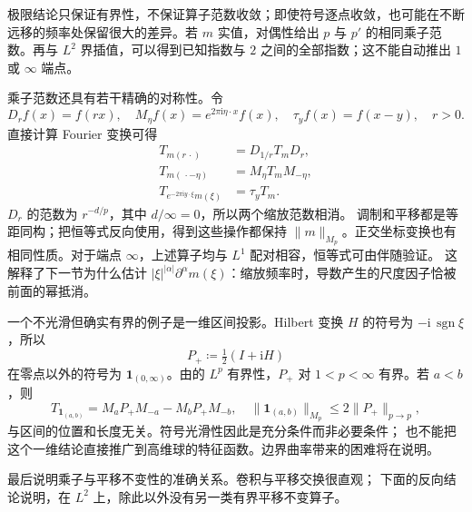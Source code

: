 极限结论只保证有界性，不保证算子范数收敛；即使符号逐点收敛，也可能在不断远移的频率处保留很大的差异。若 \(m\) 实值，对偶性给出 \(p\) 与 \(p'\) 的相同乘子范数。再与 \(L^2\) 界插值，可以得到已知指数与 \(2\) 之间的全部指数；这不能自动推出 \(1\) 或 \(\infty\) 端点。

\ProseParagraphBreak
乘子范数还具有若干精确的对称性。令
\[
 D_rf(x)=f(rx),\quad M_\eta f(x)=e^{2\pi\mathrm i\eta\cdot x}f(x),
 \quad \tau_yf(x)=f(x-y),\quad r>0.
\]
直接计算 Fourier 变换可得
\[
 \begin{aligned}
 T_{m(r\,\cdot)}&=D_{1/r}T_mD_r,\\
 T_{m(\,\cdot-\eta)}&=M_\eta T_mM_{-\eta},\\
 T_{e^{-2\pi\mathrm i y\cdot\xi}m(\xi)}&=\tau_yT_m.
 \end{aligned}
\]
\(D_r\) 的范数为 \(r^{-d/p}\)，其中 \(d/\infty=0\)，所以两个缩放范数相消。
调制和平移都是等距同构；把恒等式反向使用，得到这些操作都保持
\(\|m\|_{M_p}\)。正交坐标变换也有相同性质。对于端点 \(\infty\)，上述算子均与 \(L^1\) 配对相容，恒等式可由伴随验证。
这解释了下一节为什么估计
\(|\xi|^{|\alpha|}\partial^\alpha m(\xi)\)：缩放频率时，导数产生的尺度因子恰被前面的幂抵消。

\ProseParagraphBreak
一个不光滑但确实有界的例子是一维区间投影。Hilbert 变换 \(H\) 的符号为
\(-\mathrm i\,\operatorname{sgn}\xi\)，所以
\[
 P_+\coloneqq\tfrac12(I+\mathrm i H)
\]
在零点以外的符号为 \(\mathbf1_{(0,\infty)}\)。由的
\(L^p\) 有界性，\(P_+\) 对 \(1<p<\infty\) 有界。若 \(a<b\)，则
\[
 T_{\mathbf1_{(a,b)}}=
 M_aP_+M_{-a}-M_bP_+M_{-b},
 \quad
 \|\mathbf1_{(a,b)}\|_{M_p}\leq2\|P_+\|_{p\to p},
\]
与区间的位置和长度无关。符号光滑性因此是充分条件而非必要条件；
也不能把这个一维结论直接推广到高维球的特征函数。边界曲率带来的困难将在说明。

\ProseParagraphBreak
最后说明乘子与平移不变性的准确关系。卷积与平移交换很直观；
下面的反向结论说明，在 \(L^2\) 上，除此以外没有另一类有界平移不变算子。


